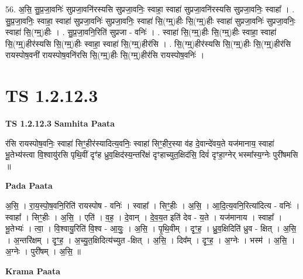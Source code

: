 \documentclass[17pt]{extarticle}
\begin{document}
56. अ॒सि॒ सु॒प्र॒जा॒वनिः॑ सुप्रजा॒वनि॑रस्यसि सुप्रजा॒वनिः॒ स्वाहा॒ स्वाहा॑ सुप्रजा॒वनि॑रस्यसि सुप्रजा॒वनिः॒ स्वाहा᳚ । . सु॒प्र॒जा॒वनिः॒ स्वाहा॒ स्वाहा॑ सुप्रजा॒वनिः॑ सुप्रजा॒वनिः॒ स्वाहा॑ सि॒(ग्म्॒)हीः सि॒(ग्म्॒)हीः स्वाहा॑ सुप्रजा॒वनिः॑ सुप्रजा॒वनिः॒ स्वाहा॑ सि॒(ग्म्॒)हीः । . सु॒प्र॒जा॒वनि॒रिति॑ सुप्रजा - वनिः॑ । . स्वाहा॑ सि॒(ग्म्॒)हीः सि॒(ग्म्॒)हीः स्वाहा॒ स्वाहा॑ सि॒(ग्म्॒)हीर॑स्यसि सि॒(ग्म्॒)हीः स्वाहा॒ स्वाहा॑ सि॒(ग्म्॒)हीर॑सि । . सि॒(ग्म्॒)हीर॑स्यसि सि॒(ग्म्॒)हीः सि॒(ग्म्॒)हीर॑सि रायस्पोष॒वनी॑ रायस्पोष॒वनि॑रसि सि॒(ग्म्॒)हीः सि॒(ग्म्॒)हीर॑सि रायस्पोष॒वनिः॑ । \newline
\pagebreak
{}

\section{ TS 1.2.12.3 }

\textbf{TS 1.2.12.3 } \newline
\textbf{Samhita Paata} \newline

र॑सि रायस्पोष॒वनिः॒ स्वाहा॑ सिꣳ॒॒हीर॑स्यादित्य॒वनिः॒ स्वाहा॑ सिꣳ॒॒हीर॒स्या व॑ह दे॒वान्दे॑वय॒ते यज॑मानाय॒ स्वाहा॑ भू॒तेभ्य॑स्त्वा वि॒श्वायु॑रसि पृथि॒वीं दृꣳ॑ह ध्रुव॒क्षिद॑स्य॒न्तरि॑क्षं दृꣳहाच्युत॒क्षिद॑सि॒ दिवं॑ दृꣳहा॒ग्नेर् भस्मा᳚स्य॒ग्नेः पुरी॑षमसि ॥ \newline

\textbf{Pada Paata} \newline

अ॒सि॒ । रा॒य॒स्पो॒ष॒वनि॒रिति॑ रायस्पोष - वनिः॑ । स्वाहा᳚ । सिꣳ॒॒हीः । अ॒सि॒ । आ॒दि॒त्य॒वनि॒रित्या॑दित्य - वनिः॑ । स्वाहा᳚ । सिꣳ॒॒हीः । अ॒सि॒ । एति॑ । व॒ह॒ । दे॒वान् । दे॒व॒य॒त इति॑ देव - य॒ते । यज॑मानाय । स्वाहा᳚ । भू॒तेभ्यः॑ । त्वा॒ । वि॒श्वायु॒रिति॑ वि॒श्व - आ॒युः॒ । अ॒सि॒ । पृ॒थि॒वीम् । दृꣳ॒॒ह॒ । ध्रु॒व॒क्षिदिति॑ ध्रुव - क्षित् । अ॒सि॒ । अ॒न्तरि॑क्षम् । दृꣳ॒॒ह॒ । अ॒च्यु॒त॒क्षिदित्य॑च्युत -क्षित् । अ॒सि॒ । दिव᳚म् । दृꣳ॒॒ह॒ । अ॒ग्नेः । भस्म॑ । अ॒सि॒ । अ॒ग्नेः । पुरी॑षम् । अ॒सि॒ ॥  \newline


\textbf{Krama Paata} \newline
\end{document}
